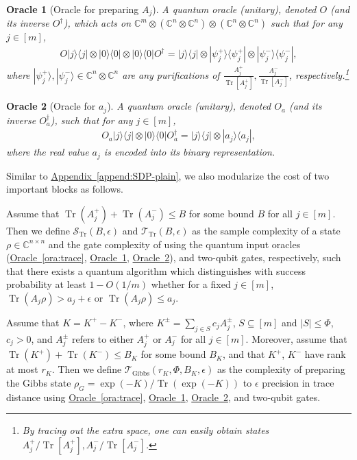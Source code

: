 \documentclass[a4paper,UKenglish,cleveref, autoref]{lipics-v2019}
\newtheorem{oracle}{Oracle}
\theoremstyle{remark}
\numberwithin{equation}{section}
\numberwithin{oracle}{section}
\numberwithin{remark}{section}
\newcommand{\ora}[1]{\hyperref[ora:#1]{Oracle~\ref*{ora:#1}}}
\newcommand{\append}[1]{\hyperref[append:#1]{Appendix~\ref*{append:#1}}}
\def\>{\rangle}
\def\<{\langle}
\newcommand{\range}[1]{[#1]}
\newcommand{\C}{\ensuremath{\mathbb{C}}}
\DeclareMathOperator{\tr}{Tr}
\DeclareMathOperator{\Tr}{Tr}
\begin{document}
\begin{oracle}[Oracle for preparing $A_{j}$] \label{ora:prep}
A quantum oracle (unitary), denoted $O$ (and its inverse $O^\dagger$), which acts on $\C^{m}\otimes(\C^{n}\otimes\C^{n}) \otimes (\C^{n}\otimes\C^{n})$ such that for any $j\in\range{m}$,
\begin{align}
O|j\>\<j|\otimes |0\>\<0|\otimes |0\>\<0|O^{\dagger}=|j\>\<j|\otimes |\psi_{j}^{+}\>\<\psi_{j}^{+}| \otimes |\psi_{j}^{-}\>\<\psi_{j}^{-}|,
\end{align}
where $|\psi_{j}^{+}\>, |\psi_{j}^{-}\> \in \C^{n}\otimes\C^{n}$ are any purifications of $\frac{A_{j}^{+}}{\Tr[A_{j}^{+}]}, \frac{A_{j}^{-}}{\Tr[A_{j}^{-}]}$, respectively.\footnote{By tracing out the extra space, one can easily obtain states $A_{j}^{+}/\Tr[A_{j}^{+}], A_{j}^{-}/\Tr[A_{j}^{-}]$.}
\end{oracle}

\begin{oracle}[Oracle for $a_{j}$]\label{ora:a}
A quantum oracle (unitary), denoted $O_{a}$ (and its inverse $O_{a}^\dagger$), such that for any $j\in\range{m}$,
\begin{align}
O_{a}|j\>\<j|\otimes |0\>\<0|O_{a}^{\dagger}=|j\>\<j|\otimes |a_{j}\>\<a_{j}|,
\end{align}
where the real value $a_{j}$ is encoded into its binary representation.
\end{oracle}

Similar to \append{SDP-plain}, we also modularize the cost of two important blocks as follows.

\begin{definition}\label{defn:quantum-trace}
Assume that $\Tr(A_{j}^{+})+\Tr(A_{j}^{-})\leq B$ for some bound $B$ for all $j\in\range{m}$. Then we define $\mathcal{S}_{\tr}(B,\epsilon)$ and $\mathcal{T}_{\tr}(B,\epsilon)$ as the sample complexity of a state $\rho\in\C^{n\times n}$ and the gate complexity of using the quantum input oracles (\ora{trace}, \ora{prep}, \ora{a}), and two-qubit gates, respectively, such that there exists a quantum algorithm which distinguishes with success probability at least $1-O(1/m)$ whether for a fixed $j\in\range{m}$, $\tr(A_{j} \rho)>a_{j}+\epsilon$ or $\tr(A_{j} \rho)\leq a_{j}$.
\end{definition}

\begin{definition}\label{defn:quantum-Gibbs}
Assume that $K = K^+ - K^-$, where $K^{\pm}=\sum_{j \in S} c_j A_j^{\pm}$,  $S\subseteq\range{m}$ and $|S|\leq\Phi$, $c_j>0$, and $A_j^{\pm}$ refers to either $A_j^{+}$ or $A_j^{-}$ for all $j\in\range{m}$. Moreover, assume that $\tr(K^+) + \tr(K^-) \leq B_{K}$ for some bound $B_{K}$, and that $K^+$, $K^-$ have rank at most $r_{K}$. Then we define $\mathcal{T}_{\text{Gibbs}}(r_{K},\Phi,B_{K},\epsilon)$ as the complexity of preparing the Gibbs state $\rho_{G}=\exp(-K)/\tr(\exp(-K))$ to $\epsilon$ precision in trace distance using \ora{trace}, \ora{prep}, \ora{a}, and two-qubit gates.
\end{definition}
\end{document}
